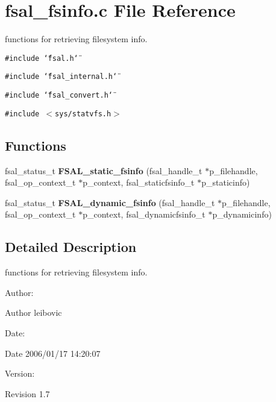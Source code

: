 \section{fsal\_\-fsinfo.c File Reference}
\label{fsal__fsinfo_8c}
functions for retrieving filesystem info. 

{\tt \#include \char`\"{}fsal.h\char`\"{}}\par
{\tt \#include \char`\"{}fsal\_\-internal.h\char`\"{}}\par
{\tt \#include \char`\"{}fsal\_\-convert.h\char`\"{}}\par
{\tt \#include $<$sys/statvfs.h$>$}\par
\subsection*{Functions}
\begin{CompactItemize}
\item 
fsal\_\-status\_\-t {\bf FSAL\_\-static\_\-fsinfo} (fsal\_\-handle\_\-t $\ast$p\_\-filehandle, fsal\_\-op\_\-context\_\-t $\ast$p\_\-context, fsal\_\-staticfsinfo\_\-t $\ast$p\_\-staticinfo)
\item 
fsal\_\-status\_\-t {\bf FSAL\_\-dynamic\_\-fsinfo} (fsal\_\-handle\_\-t $\ast$p\_\-filehandle, fsal\_\-op\_\-context\_\-t $\ast$p\_\-context, fsal\_\-dynamicfsinfo\_\-t $\ast$p\_\-dynamicinfo)
\end{CompactItemize}


\subsection{Detailed Description}
functions for retrieving filesystem info. 

\begin{Desc}
\item[Author:]\begin{Desc}
\item[Author]leibovic \end{Desc}
\end{Desc}
\begin{Desc}
\item[Date:]\begin{Desc}
\item[Date]2006/01/17 14:20:07 \end{Desc}
\end{Desc}
\begin{Desc}
\item[Version:]\begin{Desc}
\item[Revision]1.7 \end{Desc}
\end{Desc}


